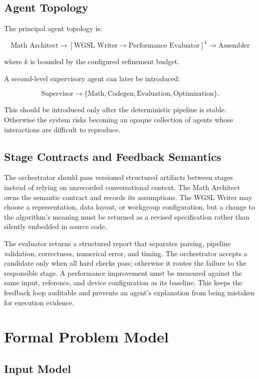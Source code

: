 \documentclass[11pt,a4paper,oneside]{report}
\begin{document}
\section{Agent Topology}

The principal agent topology is:

\[
\boxed{
\text{Math Architect}
\rightarrow
\left[
\text{WGSL Writer}
\rightarrow
\text{Performance Evaluator}
\right]^{k}
\rightarrow
\text{Assembler}
}
\]

where $k$ is bounded by the configured refinement budget.

A second-level supervisory agent can later be introduced:

\[
\text{Supervisor}
\rightarrow
\{\text{Math},\text{Codegen},\text{Evaluation},\text{Optimization}\}.
\]

This should be introduced only after the deterministic pipeline is stable. Otherwise the system
risks becoming an opaque collection of agents whose interactions are difficult to reproduce.

\section{Stage Contracts and Feedback Semantics}

The orchestrator should pass versioned structured artifacts between stages instead of relying on
unrecorded conversational context. The Math Architect owns the semantic contract and records its
assumptions. The WGSL Writer may choose a representation, data layout, or workgroup configuration,
but a change to the algorithm's meaning must be returned as a revised specification rather than
silently embedded in source code.

The evaluator returns a structured report that separates parsing, pipeline validation,
correctness, numerical error, and timing. The orchestrator accepts a candidate only when all hard
checks pass; otherwise it routes the failure to the responsible stage. A performance improvement
must be measured against the same input, reference, and device configuration as its baseline. This
keeps the feedback loop auditable and prevents an agent's explanation from being mistaken for
execution evidence.

\chapter{Formal Problem Model}

\section{Input Model}
\end{document}
